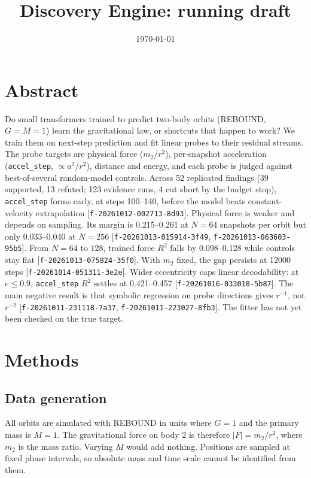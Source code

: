 \documentclass{article}
\title{Discovery Engine: running draft}
\date{\today}
\begin{document}
\maketitle


\section{Abstract}

Do small transformers trained to predict two-body orbits (REBOUND, $G = M = 1$) learn the gravitational law, or shortcuts that happen to work? We train them on next-step prediction and fit linear probes to their residual streams. The probe targets are physical force ($m_2/r^2$), per-snapshot acceleration (\texttt{accel\_step}, $\propto a^3/r^2$), distance and energy, and each probe is judged against best-of-several random-model controls. Across 52 replicated findings (39 supported, 13 refuted; 123 evidence runs, 4 cut short by the budget stop), \texttt{accel\_step} forms early, at steps 100–140, before the model beats constant-velocity extrapolation [\texttt{f-20261012-002713-8d93}]. Physical force is weaker and depends on sampling. Its margin is 0.215–0.261 at $N = 64$ snapshots per orbit but only 0.033–0.040 at $N = 256$ [\texttt{f-20261013-015914-3f49}, \texttt{f-20261013-063603-95b5}]. From $N = 64$ to $128$, trained force $R^2$ falls by 0.098–0.128 while controls stay flat [\texttt{f-20261013-075824-35f0}]. With $m_2$ fixed, the gap persists at 12000 steps [\texttt{f-20261014-051311-3e2e}]. Wider eccentricity caps linear decodability: at $e \le 0.9$, \texttt{accel\_step} $R^2$ settles at 0.421–0.457 [\texttt{f-20261016-033018-5b87}]. The main negative result is that symbolic regression on probe directions gives $r^{-1}$, not $r^{-2}$ [\texttt{f-20261011-231118-7a37}, \texttt{f-20261011-223027-8fb3}]. The fitter has not yet been checked on the true target.

\section{Methods}

\subsection{Data generation}

All orbits are simulated with REBOUND in units where $G = 1$ and the primary mass is $M = 1$. The gravitational force on body 2 is therefore $|F| = m_2/r^2$, where $m_2$ is the mass ratio. Varying $M$ would add nothing. Positions are sampled at fixed phase intervals, so absolute mass and time scale cannot be identified from them.
\end{document}

